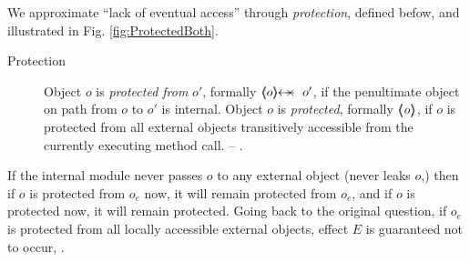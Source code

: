 We approximate ``lack of eventual access'' through \emph{protection}, defined befow, and illustrated in %
Fig.  \ref{fig:ProtectedBoth}.  %

 \begin{description}
\item[Protection] Object $o$ is \emph{protected  from} $o'$, formally $\protectedFrom {o} {o'}$,  
 if the penultimate object on  path from $o$ to $o'$  is internal.
Object $o$ is \emph{protected}, formally ${\langle\!\!\langle \mbox{\normalfont{\texttt{\it{o}}}} \rangle\!\!\rangle}$, if $o$ is protected from all external objects transitively accessible from the currently executing method call. %
-- \cf {}. %

 \end{description}
 


If the  internal module  never passes $o$ to any external object (\ie never leaks $o$,) then if $o$ is protected from $o_e$ now, it will remain protected from $o_e$,
and if $o$ is protected now, it will remain protected.
Going back to the original question, if $o_e$ is protected from all locally accessible external objects, effect  $E$ is guaranteed not to occur, .


